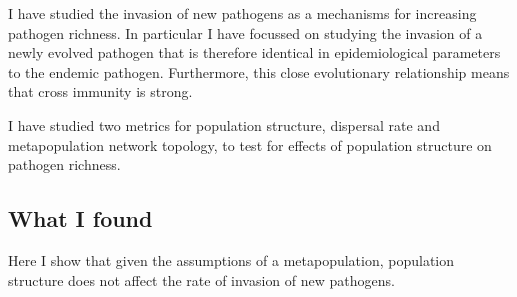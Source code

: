 I have studied the invasion of new pathogens as a mechanisms for increasing pathogen richness.
In particular I have focussed on studying the invasion of a newly evolved pathogen that is therefore identical in epidemiological parameters to the endemic pathogen.
Furthermore, this close evolutionary relationship means that cross immunity is strong.

I have studied two metrics for population structure, dispersal rate and metapopulation network topology, to test for effects of population structure on pathogen richness.

\subsection{What I found}

Here I show that given the assumptions of a metapopulation, population structure does not affect the rate of invasion of new pathogens.




